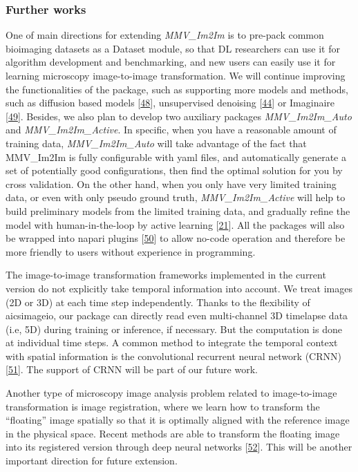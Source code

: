 \hypertarget{further-works}{%
\subsubsection{Further works}\label{further-works}}

One of main directions for extending \emph{MMV\_Im2Im} is to pre-pack common bioimaging datasets as a Dataset module, so that DL researchers can use it for algorithm development and benchmarking, and new users can easily use it for learning microscopy image-to-image transformation. We will continue improving the functionalities of the package, such as supporting more models and methods, such as diffusion based models {[}\protect\hyperlink{ref-1A3yurr7m}{48}{]}, unsupervised denoising {[}\protect\hyperlink{ref-4vnyY9J9}{44}{]} or Imaginaire {[}\protect\hyperlink{ref-vzOBQiEH}{49}{]}. Besides, we also plan to develop two auxiliary packages \emph{MMV\_Im2Im\_Auto} and \emph{MMV\_Im2Im\_Active}. In specific, when you have a reasonable amount of training data, \emph{MMV\_Im2Im\_Auto} will take advantage of the fact that MMV\_Im2Im is fully configurable with yaml files, and automatically generate a set of potentially good configurations, then find the optimal solution for you by cross validation. On the other hand, when you only have very limited training data, or even with only pseudo ground truth, \emph{MMV\_Im2Im\_Active} will help to build preliminary models from the limited training data, and gradually refine the model with human-in-the-loop by active learning {[}\protect\hyperlink{ref-jM3v1UjQ}{21}{]}. All the packages will also be wrapped into napari plugins {[}\protect\hyperlink{ref-YEMgt2T4}{50}{]} to allow no-code operation and therefore be more friendly to users without experience in programming.

The image-to-image transformation frameworks implemented in the current version do not explicitly take temporal information into account. We treat images (2D or 3D) at each time step independently. Thanks to the flexibility of aicsimageio, our package can directly read even multi-channel 3D timelapse data (i.e, 5D) during training or inference, if necessary. But the computation is done at individual time steps. A common method to integrate the temporal context with spatial information is the convolutional recurrent neural network (CRNN) {[}\protect\hyperlink{ref-s2RBSHdH}{51}{]}. The support of CRNN will be part of our future work.

Another type of microscopy image analysis problem related to image-to-image transformation is image registration, where we learn how to transform the ``floating'' image spatially so that it is optimally aligned with the reference image in the physical space. Recent methods are able to transform the floating image into its registered version through deep neural networks {[}\protect\hyperlink{ref-1Fh9QLxl9}{52}{]}. This will be another important direction for future extension.


